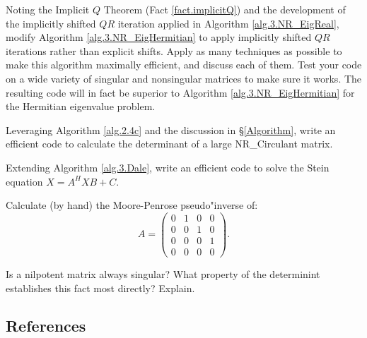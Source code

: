 \begin{exercise} \label{ex:04.impshiftherm} \rm Noting the Implicit $Q$ Theorem (Fact \ref{fact.implicitQ}) and the development of the implicitly shifted $QR$ iteration
applied in Algorithm \ref{alg.3.NR_EigReal}, modify Algorithm \ref{alg.3.NR_EigHermitian} to apply implicitly shifted $QR$ iterations rather than explicit shifts.  Apply as many
techniques as possible to make this algorithm maximally efficient, and discuss each of them.  Test your code on a wide variety of singular and nonsingular matrices
to make sure it works.  The resulting code will in fact be superior to Algorithm \ref{alg.3.NR_EigHermitian} for the Hermitian eigenvalue problem.
\end{exercise}

\begin{exercise} \label{ex:04.det} \rm Leveraging Algorithm \ref{alg.2.4c} and the discussion in \S \ref{Algorithm},
write an efficient code to calculate the determinant of a large NR_Circulant matrix.
\end{exercise}

\begin{exercise} \label{ex:04.stein} \rm Extending Algorithm \ref{alg.3.Dale}, write an efficient code to solve the Stein equation $X = A^H X B + C$.
\end{exercise}

\begin{exercise} \label{ex:04.pseudoinverse} \rm Calculate (by hand) the Moore-Penrose pseudo"inverse of:
\begin{equation*}
A=\begin{pmatrix} 0 & 1 & 0 & 0\\ 0 & 0 & 1 & 0\\ 0 & 0 & 0 & 1\\ 0 & 0 & 0 & 0 \end{pmatrix}.
\end{equation*}
\end{exercise}

\begin{exercise} \label{ex:04.nilpotent.singular} \rm Is a nilpotent matrix always singular?  What property of the determinint establishes this fact most
directly?  Explain.
\end{exercise}

\subsection*{References}\label{sec:04.References}

